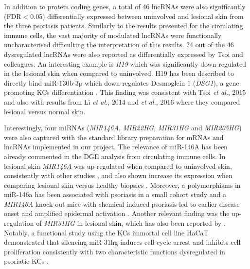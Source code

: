 In addition to protein coding genes, a total of 46 lncRNAs were also significantly (FDR$<$0.05) differentially expressed between uninvolved and lesional skin from the three psoriasis patients. Similarly to the results presented for the circulating immune cells, the vast majority of  modulated lncRNAs were functionally uncharacterised difficulting the interpretation of this results. 24 out of the 46 dysregulated lncRNAs were also reported as differentially expressed by Tsoi and colleagues. An interesting  example is \textit{H19} which was significantly down-regulated in the lesional skin when compared to uninvolved. H19 has been described to directly bind miR-130b-3p which down-regulates Desmoglein 1 (\textit{DSG1}), a gene promoting KCs differentiation \parencite{Li2017}. This finding was consistent with Tsoi \textit{et al.}, 2015 and also with results from Li \textit{et al.}, 2014 and \textit{et al.}, 2016 where they compared lesional versus normal skin. 

Interestingly, four miRNAs (\textit{MIR146A}, \textit{MIR22HG}, \textit{MIR31HG} and \textit{MIR205HG}) were also captured with the standard library preparation for mRNAs and lncRNAs implemented in our project. The relevance of miR-146A has been already commented in the DGE analysis from circulating immune cells. In lesional skin \textit{MIR146A} was up-regulated when compared to uninvolved skin, consistently with other studies \parencite{Lerman2014, Tsoi2015}, and also shown increase its expression when comparing lesional skin versus healthy biopsies \parencite{Li2014}. Moreover, a polymorphisms in miR-146a has been associated with psoriasis in a small cohort study and a \textit{MIR146A} knock-out mice with chemical induced psoriasis led to earlier disease onset and amplified epidermal activation \parencite{Srivastava2017}. Another relevant finding was the up-regulation of \textit{MIR31HG} in lesional skin, which has also been reported by \parencite{Tsoi2015}. Notably, a functional study using the KCs immortal cell line HaCaT demonstrated that silencing miR-31hg induces cell cycle arrest and inhibits cell proliferation consistently with two characteristic functions dysregulated in psoriatic KCs \parencite{Gao2018}.

